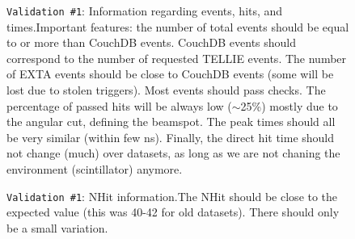 \documentclass[12pt]{article}
\begin{document}
\begin{figure}
\centering
\noindent{}
  \caption{\centering \texttt{Validation \#1}: Information regarding events, hits, and times.\hspace{\textwidth}Important features: the number of total events should be equal to or more than CouchDB events. CouchDB events should correspond to the number of requested TELLIE events. The number of EXTA events should be close to CouchDB events (some will be lost due to stolen triggers). Most events should pass checks. The percentage of passed hits will be always low ($\sim$25\%) mostly due to the angular cut, defining the beamspot. The peak times should all be very similar (within few ns). Finally, the direct hit time should not change (much) over datasets, as long as we are not chaning the environment (scintillator) anymore.}
  \label{fig:val2}
\end{figure}

\begin{figure}
\centering
\noindent{}
  \caption{\centering \texttt{Validation \#1}: NHit information.\hspace{\textwidth}The NHit should be close to the expected value (this was 40-42 for old datasets). There should only be a small variation.}
  \label{fig:val3}
\end{figure}
\end{document}

